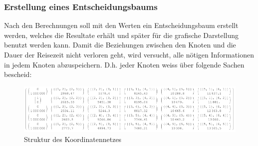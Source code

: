 \subsubsection{Erstellung eines Entscheidungsbaums}
Nach den Berechnungen soll mit den Werten ein Entscheidungsbaum erstellt werden, welches die Resultate erhält und später für die grafische Darstellung benutzt werden kann. Damit die Beziehungen zwischen den Knoten und die Dauer der Reisezeit nicht verloren geht, wird versucht, alle nötigen Informationen in jedem Knoten abzuspeichern. D.h. jeder Knoten weiss über folgende Sachen bescheid: 
\begin{figure}[h!]
\centering
\includegraphics[width=1\linewidth]{img/grid_structure}
\caption{Struktur des Koordinatennetzes}
\label{gridnetConn}
\end{figure}